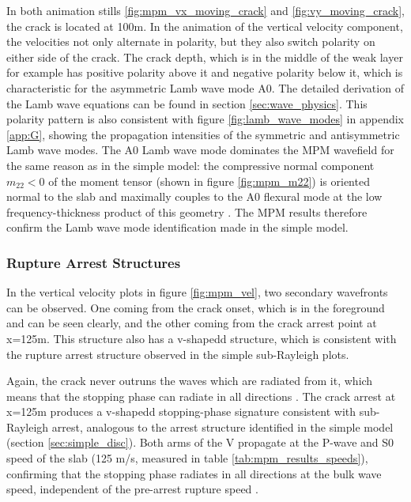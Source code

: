 In both animation stills  \ref{fig:mpm_vx_moving_crack} and \ref{fig:vy_moving_crack}, the crack is located at 100m. In the animation of the vertical velocity component, the velocities not only alternate in polarity, but they also switch polarity on either side of the crack. The crack depth, which is in the middle of the weak layer for example has positive polarity above it and negative polarity below it, which is characteristic for the asymmetric Lamb wave mode A0. The detailed derivation of the Lamb wave equations can be found in section \ref{sec:wave_physics}. This polarity pattern is also consistent with figure \ref{fig:lamb_wave_modes} in appendix \ref{app:G}, showing the propagation intensities of the symmetric and antisymmetric Lamb wave modes. The A0 Lamb wave mode dominates the MPM wavefield for the same reason as in the simple model: the compressive normal component $m_{22} <0$ of the moment tensor (shown in figure \ref{fig:mpm_m22}) is oriented normal to the slab and maximally couples to the A0 flexural mode at the low frequency-thickness product of this geometry \parencite{roseWavesPlates2014}. The MPM results therefore confirm the Lamb wave mode identification made in the simple model. \par

\subsubsection{Rupture Arrest Structures}
In the vertical velocity plots in figure \ref{fig:mpm_vel}, two secondary wavefronts can be observed. One coming from the crack onset, which is in the foreground and can be seen clearly, and the other coming from the crack arrest point at x=125m. This structure also has a v-shapedd structure, which is consistent with the rupture arrest structure observed in the simple sub-Rayleigh plots. \par

Again, the crack never outruns the waves which are radiated from it, which means that the stopping phase can radiate in all directions \parencite{freundDynamicFractureMechanics1998}. The crack arrest at x=125m produces a v-shapedd stopping-phase signature consistent with sub-Rayleigh arrest, analogous to the arrest structure identified in the simple model (section \ref{sec:simple_disc}). Both arms of the V propagate at the P-wave and S0 speed of the slab (125 m/s, measured in table \ref{tab:mpm_results_speeds}), confirming that the stopping phase radiates in all directions at the bulk wave speed, independent of the pre-arrest rupture speed \parencite{madariagaHighfrequencyRadiationCrack1977}. \par 


